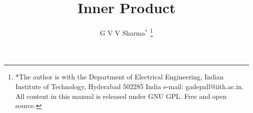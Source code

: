 \documentclass[journal,12pt,twocolumn]{IEEEtran}
\begin{document}
\let\StandardTheFigure\thefigure
\let\vec\mathbf
\renewcommand{\thefigure}{\theproblem}



\def\putbox#1#2#3{\makebox[0in][l]{\makebox[#1][l]{}\raisebox{\baselineskip}[0in][0in]{\raisebox{#2}[0in][0in]{#3}}}}
     \def\rightbox#1{\makebox[0in][r]{#1}}
     \def\centbox#1{\makebox[0in]{#1}}
     \def\topbox#1{\raisebox{-\baselineskip}[0in][0in]{#1}}
     \def\midbox#1{\raisebox{-0.5\baselineskip}[0in][0in]{#1}}

\vspace{3cm}

\title{
	Inner Product
}
\author{ G V V Sharma$^{*}$%
	\thanks{*The author is with the Department
		of Electrical Engineering, Indian Institute of Technology, Hyderabad
		502285 India e-mail:  gadepall@iith.ac.in. All content in this manual is released under GNU GPL.  Free and open source.}
	
}	


%
%
%

% 
%
\end{document}
